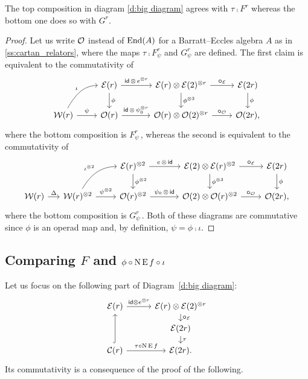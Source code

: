 \begin{lemma}\label{l:main_diag}
	The top composition in diagram \eqref{d:big diagram} agrees with $\tau \comp F^r$ whereas the bottom one does so with $G^r$.
\end{lemma}

\begin{proof}
	Let us write $\mathcal{O}$ instead of $\mathrm{End}(A)$ for a Barratt--Eccles algebra $A$ as in \cref{ss:cartan_relators}, where the maps $\tau \comp F_\psi^r$ and $G_\psi^r$ are defined.
	The first claim is equivalent to the commutativity of
	\[
	\begin{tikzcd}
		&
		\BE(r) \arrow[d,"\phi"] \arrow[r,"\id\, \ot\, e^{\ot r}"] &[10pt]
		\BE(r) \ot \BE(2)^{\ot r} \arrow[d,"\phi^{\ot 3}"] \arrow[r,"\bcomp_{\BE}"] &
		\BE(2r) \arrow[d,"\phi"] \\
		\cW(r) \arrow[r,"\psi"] \arrow[ur, in=180, out=60,"\iota"] &
		\cO(r) \arrow[r,"\id\, \ot\, \psi_0^{\ot r}"] &
		\cO(r) \ot \cO(2)^{\ot r} \arrow[r,"\bcomp_{\cO}"] &
		\cO(2r),
	\end{tikzcd}
	\]
	where the bottom composition is $F_\psi^r$\,, whereas the second is equivalent to the commutativity of
	\[
	\begin{tikzcd}
		&[-10pt] &
		\BE(r)^{\ot2} \arrow[d,"\phi^{\ot 2}"] \arrow[r,"e\,\ot\,\id"] &[10pt]
		\BE(2) \ot \BE(r)^{\ot2} \arrow[d,"\phi^{\ot 3}"] \arrow[r,"\bcomp_{\BE}"] &
		\BE(2r) \arrow[d,"\phi"] \\
		\cW(r) \arrow[r,"\Delta"] &
		\cW(r)^{\ot 2} \arrow[r,"\psi^{\ot 2}"] \arrow[ur, in=180, out=60,"\iota^{\ot 2}"] &
		\cO(r)^{\ot 2} \arrow[r,"\psi_0\,\ot\,\id"] &
		\cO(2) \ot \cO(r)^{\ot 2} \arrow[r,"\bcomp_{\cO}"] &
		\cO(2r),
	\end{tikzcd}
	\]
	where the bottom composition is $G_\psi^r$\,.
	Both of these diagrams are commutative since $\phi$ is an operad map and, by definition, $\psi = \phi \comp \iota$.
\end{proof}

\subsection{Comparing $F$ and $\phi \mathbin{\circ} \operatorname{N}\operatorname{E} f \mathbin{\circ} \iota$}

Let us focus on the following part of Diagram~\eqref{d:big diagram}:
\[
\begin{tikzcd}[row sep=small]
	\BE(r) \arrow[r,"\id \ot e^{\ot r}"] &[5pt]
	\BE(r) \ot \BE(2)^{\ot r} \arrow[d,"\bcomp_{\BE}"] \\ &
	\BE(2r) \arrow[d, "\tau"] \\
	\cC(r) \arrow[uu,hook] \arrow[r,"\tau \comp \chains\EE f"] & \BE(2r).
\end{tikzcd}
\]
Its commutativity is a consequence of the proof of the following.


